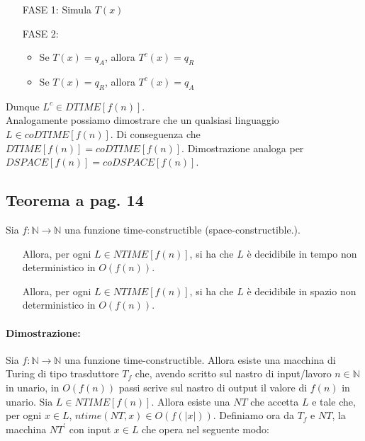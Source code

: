 \begin{enumerate}
    \item [FASE 1:] Simula $T(x)$
    \item [FASE 2:]{
        \begin{itemize}
            \item Se $T(x) = q_{A}$, allora $T^{c}(x) = q_{R}$
            \item Se $T(x) = q_{R}$, allora $T^{c}(x) = q_{A}$
        \end{itemize}
    }
\end{enumerate}
Dunque $L^{c} \in DTIME[f(n)]$.\\
Analogamente possiamo dimostrare che un qualsiasi linguaggio $L \in coDTIME[f(n)]$. Di conseguenza che $DTIME[f(n)] = coDTIME[f(n)]$.
Dimostrazione analoga per $DSPACE[f(n)] = coDSPACE[f(n)]$.

\subsection{Teorema a pag. 14}

Sia $f: \mathbb{N} \rightarrow \mathbb{N}$ una funzione time-constructible (space-constructible.).
\begin{itemize}
    \item []{
        Allora, per ogni $L \in NTIME[f(n)]$, si ha che $L$ è decidibile in tempo non deterministico in $O(f(n))$.
    }
    \item []{
        Allora, per ogni $L \in NTIME[f(n)]$, si ha che $L$ è decidibile in spazio non deterministico in $O(f(n))$.
    }
\end{itemize}

\paragraph*{Dimostrazione:} Sia $f: \mathbb{N} \rightarrow \mathbb{N}$ una funzione time-constructible. Allora esiste
una macchina di Turing di tipo trasduttore $T_{f}$ che, avendo scritto sul nastro di input/lavoro $n \in \mathbb{N}$ in 
unario, in $O(f(n))$ passi scrive sul nastro di output il valore di $f(n)$ in unario. Sia $L \in NTIME[f(n)]$. Allora 
esiste una $NT$ che accetta $L$ e tale che, per ogni $x \in L$, $ntime(NT, x) \in O(f(|x|))$. Definiamo ora da $T_{f}$
e $NT$, la macchina $NT^{'}$ con input $x \in L$ che opera nel seguente modo:

